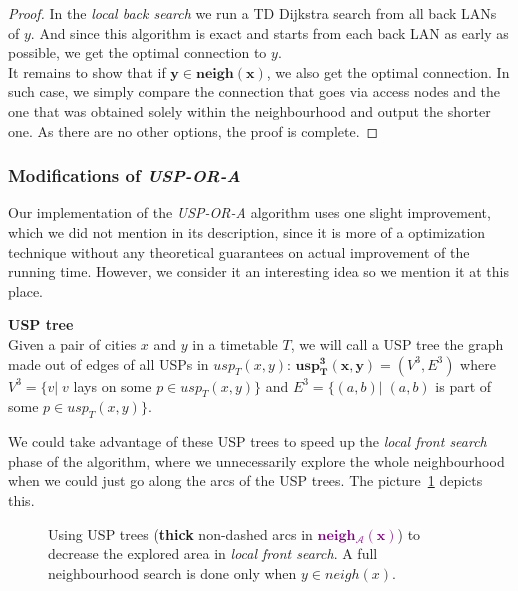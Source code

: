 \begin{proof}
			In the \textit{local back search} we run a TD Dijkstra search from all back LANs of $y$. And since this algorithm is exact and starts from each back LAN as early as possible, we get the optimal connection to $y$. \\
			
			\noindent It remains to show that if $\bm{y \in neigh(x)}$, we also get the optimal connection. In such case, we simply compare the connection that goes via access nodes and the one that was obtained solely within the neighbourhood and output the shorter one. As there are no other options, the proof is complete.
		\end{proof}
	
	\subsubsection{Modifications of \textit{USP-OR-A}}
	
		\noindent Our implementation of the \textit{USP-OR-A} algorithm uses one slight improvement, which we did not mention in its description, since it is more of a optimization technique without any theoretical guarantees on actual improvement of the running time. However, we consider it an interesting idea so we mention it at this place.
		
		\begin{definition}
	        \textbf{USP tree} \\
			Given a pair of cities $x$ and $y$ in a timetable $T$, we will call a USP tree the graph made out of edges of all USPs in $usp_{T}(x, y)$: $\bm{usp^{3}_{T}(x, y)} = (V^{3}, E^{3})$ where $V^{3} = \{v| \; v$ lays on some $p \in usp_{T}(x, y)\}$ and $E^{3} = \{(a, b)| \; (a, b)$ is part of some $p \in usp_{T}(x, y)\}$.
	    \end{definition}
	    
	    \noindent We could take advantage of these USP trees to speed up the \textit{local front search} phase of the algorithm, where we unnecessarily explore the whole neighbourhood when we could just go along the arcs of the USP trees. The picture~\ref{fig:uspora3} depicts this. 
		
		\begin{figure}[h!]
			\begin{center}
			\end{center}
			\caption{\label{fig:uspora3} Using USP trees (\textbf{thick} non-dashed arcs in \textcolor{purple}{$\bm{neigh_{\mathcal{A}}(x)}$}) to decrease the explored area in \textit{local front search}. A full neighbourhood search is done only when $y \in neigh(x)$.}
		\end{figure}
		
